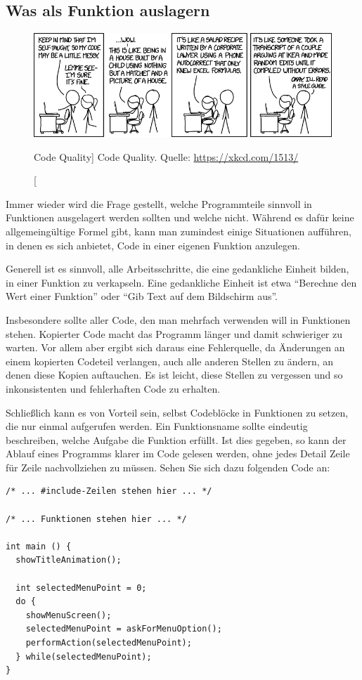 \subsection{Was als Funktion auslagern}
\FloatBarrier
\begin{figure}
\begin{center}
\includegraphics[width=\linewidth]{./gfx/xkcd-codeQuality}
\caption
	[Code Quality]
	{Code Quality. Quelle: \url{https://xkcd.com/1513/}}
\end{center}
\end{figure}
Immer wieder wird die Frage gestellt, welche Programmteile sinnvoll in Funktionen ausgelagert werden sollten und welche nicht. Während es dafür keine allgemeingültige Formel gibt, kann man zumindest einige Situationen aufführen, in denen es sich anbietet, Code in einer eigenen Funktion anzulegen.

Generell ist es sinnvoll, alle Arbeitsschritte, die eine gedankliche Einheit bilden, in einer Funktion zu verkapseln. Eine gedankliche Einheit ist etwa \enquote{Berechne den Wert einer Funktion} oder \enquote{Gib Text auf dem Bildschirm aus}.

Insbesondere sollte aller Code, den man mehrfach verwenden will in Funktionen stehen. Kopierter Code macht das Programm länger und damit schwieriger zu warten. Vor allem aber ergibt sich daraus eine Fehlerquelle, da Änderungen an einem kopierten Codeteil verlangen, auch alle anderen Stellen zu ändern, an denen diese Kopien auftauchen. Es ist leicht, diese Stellen zu vergessen und so inkonsistenten und fehlerhaften Code zu erhalten.

Schließlich kann es von Vorteil sein, selbst Codeblöcke in Funktionen zu setzen, die nur einmal aufgerufen werden. Ein Funktionsname sollte eindeutig beschreiben, welche Aufgabe die Funktion erfüllt. Ist dies gegeben, so kann der Ablauf eines Programms klarer im Code gelesen werden, ohne jedes Detail Zeile für Zeile nachvollziehen zu müssen. Sehen Sie sich dazu folgenden Code an:

\begin{codebox}
\begin{verbatim}
/* ... #include-Zeilen stehen hier ... */

/* ... Funktionen stehen hier ... */

int main () {
  showTitleAnimation();

  int selectedMenuPoint = 0;
  do {
    showMenuScreen();
    selectedMenuPoint = askForMenuOption();
    performAction(selectedMenuPoint);
  } while(selectedMenuPoint);
}
\end{verbatim}
\end{codebox}


